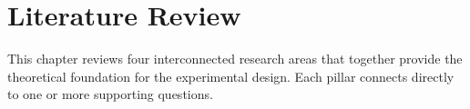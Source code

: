 \chapter{Literature Review}

This chapter reviews four interconnected research areas that together provide the
theoretical foundation for the experimental design. Each pillar connects directly to one
or more supporting questions.






